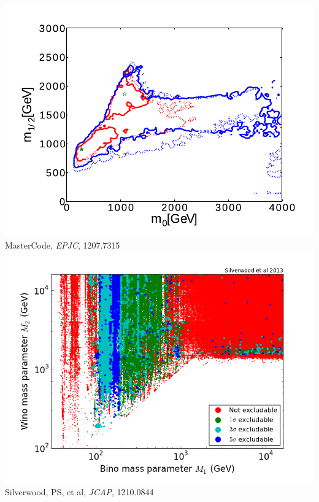 \documentclass[xcolor=dvipsnames]{beamer}
\begin{document}
\begin{frame}
\begin{columns}[c]
\includegraphics[width=\textwidth]{MasterCode2012_CMSSM}\\\vspace{-1mm}
{\tiny MasterCode, \textit{EPJC}, 1207.7315}\vspace{3mm}
\includegraphics[width=\textwidth]{PvP1_Outm1_v_Outm2}\\
{\tiny Silverwood, PS, et al, \textit{JCAP}, 1210.0844}\vspace{3mm}

\end{columns}

\end{frame}
\end{document}
